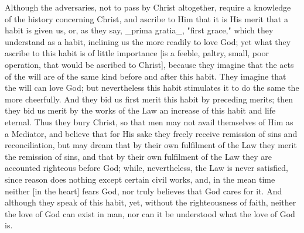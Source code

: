 Although the adversaries, not to pass by Christ altogether, require a
knowledge of the history concerning Christ, and ascribe to Him that
it is His merit that a habit is given us, or, as they say, _prima
gratia_, "first grace," which they understand as a habit, inclining
us the more readily to love God; yet what they ascribe to this habit
is of little importance [is a feeble, paltry, small, poor operation,
that would be ascribed to Christ], because they imagine that the acts
of the will are of the same kind before and after this habit.  They
imagine that the will can love God; but nevertheless this habit
stimulates it to do the same the more cheerfully.  And they bid us
first merit this habit by preceding merits; then they bid us merit by
the works of the Law an increase of this habit and life eternal.
Thus they bury Christ, so that men may not avail themselves of Him as
a Mediator, and believe that for His sake they freely receive
remission of sins and reconciliation, but may dream that by their own
fulfilment of the Law they merit the remission of sins, and that by
their own fulfilment of the Law they are accounted righteous before
God; while, nevertheless, the Law is never satisfied, since reason
does nothing except certain civil works, and, in the mean time
neither [in the heart] fears God, nor truly believes that God cares
for it.  And although they speak of this habit, yet, without the
righteousness of faith, neither the love of God can exist in man, nor
can it be understood what the love of God is.

